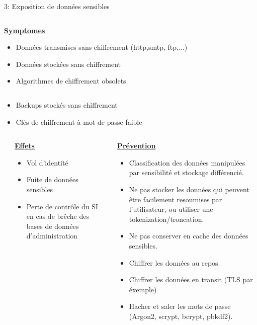\documentclass[final,hyperref={pdfpagelabels=false}]{beamer}
\begin{document}
\begin{frame}[t]
\begin{columns}[t]
\begin{column}{.465\textwidth}
\begin{block}{3: Exposition de données sensibles}
\begin{columns}[T]
		\begin{column}{.875\textwidth}
			\uline{\uline{\textbf{Symptomes}}}
			\begin{itemize}
				\item Données transmises sans chiffrement (http,smtp, ftp,...)
				\item Données stockées sans chiffrement
				\item Algorithmes de chiffrement obsolets 
			\end{itemize}
		\end{column}
	\end{columns}
	\begin{itemize}
		\item Backups stockés sans chiffrement 
		\item Clés de chiffrement à mot de passe faible
	\end{itemize}
	\begin{columns}[T]
		\begin{column}{.01\textwidth}
		\end{column}
		\begin{column}{0.495\textwidth}
			\vfill
			\uline{\textbf{Effets}}
			\begin{itemize}
				\item Vol d'identité
				\item Fuite de données sensibles
				\item Perte de contrôle du SI en cas de brêche des bases de données d'administration
			\end{itemize}
			\vfill
		\end{column}
		\begin{column}{0.495\textwidth}
			\vfill
			\uline{\textbf{Prévention}}
			\begin{itemize}
				\item Classification des données manipulées par sensibilité et stockage différencié.
				\item Ne pas stocker les données qui peuvent être facilement resoumises par l'utilisateur, ou utiliser une tokenization/troncation.
				\item Ne pas conserver en cache des données sensibles.
				\item Chiffrer les données au repos.
				\item Chiffrer les données en transit (TLS par éxemple)
				\item Hacher et saler les mots de passe (Argon2, scrypt, bcrypt, pbkdf2).
			\end{itemize}
		\end{column}
	\end{columns}




\end{block}
\end{column}
\end{columns}
\end{frame}
\end{document}
